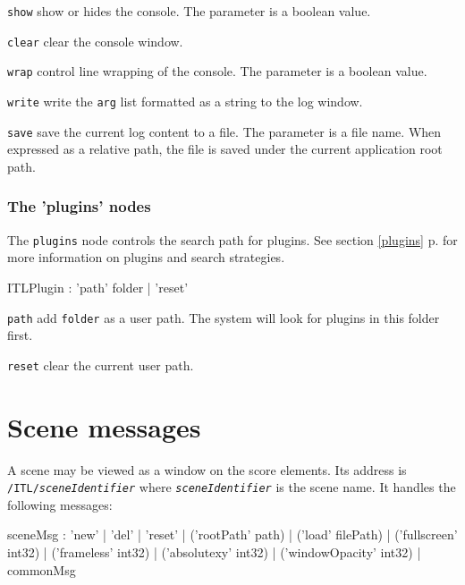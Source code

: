 \documentclass[a4paper,twoside]{report}
\newcommand{\toplevel}[1]	{\chapter{#1}}
\newcommand{\subsublevel}[1]	{\subsection{#1}}
\newcommand{\fullref}[1]	{\ref{#1} p.\pageref{#1}}
\newcommand{\OSC}[1]		{\texttt{#1}}
\let\olditemize\itemize
\let\oldenditemize\enditemize
\renewenvironment{itemize} 	{\olditemize \setlength{\itemsep}{1mm}}{\oldenditemize}
\begin{document}
\begin{itemize}
\item \OSC{show} show or hides the console. The parameter is a boolean value.
\item \OSC{clear} clear the console window.
\item \OSC{wrap} control line wrapping of the console. The parameter is a boolean value.
\item \OSC{write} write the \OSC{arg} list formatted as a string to the log window.
\item \OSC{save} save the current log content to a file. The parameter is a file name. When expressed as a relative path, the file is saved under the current application root path.
\end{itemize}



\subsublevel{The 'plugins' nodes}
\label{ITLplugins}

The \OSC{plugins} node controls the search path for plugins. See section \fullref{plugins} for more information on plugins and search strategies.

\begin{rail}
ITLPlugin : 'path'  folder
		| 'reset'
\end{rail}

\begin{itemize}
\item \OSC{path} add \OSC{folder} as a user path. The system will look for plugins in this folder first.
\item \OSC{reset} clear the current user path.
\end{itemize}


\toplevel{Scene messages}
\label{scene}
A scene may be viewed as a window on the score elements. Its address is \OSC{/ITL/\textit{sceneIdentifier}} where \OSC{\textit{sceneIdentifier}} is the scene name. It handles the following messages:
\begin{rail}
sceneMsg :  'new'
			| 'del'
			| 'reset'
			| ('rootPath' path) 
			| ('load' filePath)
			| ('fullscreen' int32)
			| ('frameless' int32)
			| ('absolutexy' int32)
			| ('windowOpacity' int32)
			| commonMsg
\end{rail}
\end{document}
